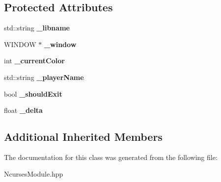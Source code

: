 \subsection*{Protected Attributes}
\begin{DoxyCompactItemize}
\item 
\mbox{\label{class_ncurses_module_a57a02110a183bdfeefa2e62fe6499561}} 
std\+::string {\bfseries \+\_\+libname}
\item 
\mbox{\label{class_ncurses_module_a3c220ea830aa9958d280a11f5c198df1}} 
W\+I\+N\+D\+OW $\ast$ {\bfseries \+\_\+window}
\item 
\mbox{\label{class_ncurses_module_aaadbdddd62e1b24b790575889e097924}} 
int {\bfseries \+\_\+current\+Color}
\item 
\mbox{\label{class_ncurses_module_a70e9d28cd0c677f48dff1897dc884d0b}} 
std\+::string {\bfseries \+\_\+player\+Name}
\item 
\mbox{\label{class_ncurses_module_aae42f9dd18b730cc110092982f17e41c}} 
bool {\bfseries \+\_\+should\+Exit}
\item 
\mbox{\label{class_ncurses_module_ad99e0bb9b38b7524ae86ba3accbbf05f}} 
float {\bfseries \+\_\+delta}
\end{DoxyCompactItemize}
\subsection*{Additional Inherited Members}


The documentation for this class was generated from the following file\+:\begin{DoxyCompactItemize}
\item 
Ncurses\+Module.\+hpp\end{DoxyCompactItemize}
